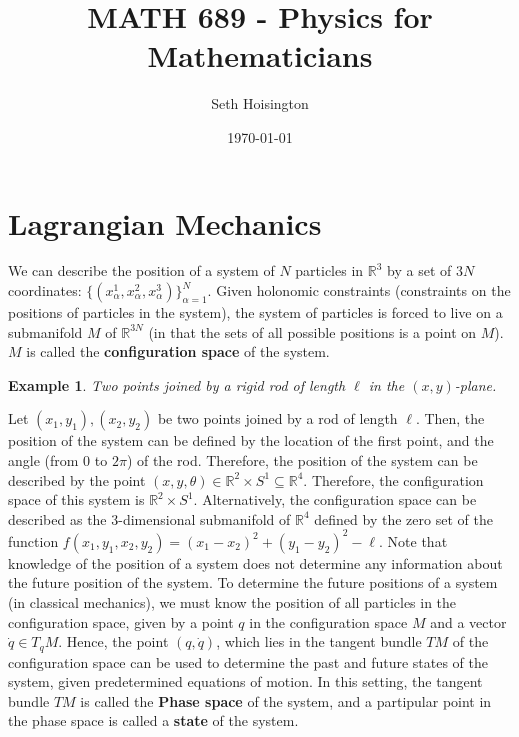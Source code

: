 \documentclass{article}
\title{MATH 689 - Physics for Mathematicians}
\author{Seth Hoisington}
\date{\today}
\newcommand{\R}{\mathbb R}
\newcommand{\nl}{\newline\newline\noindent}
\newcommand{\al}{\alpha}
\newtheorem{ex}{Example}
\begin{document}
\maketitle
\section{Lagrangian Mechanics}
We can describe the position of a system of $N$ particles in $\R^3$ by a set of $3N$ coordinates: $\{(x_\al^1,x_\al^2,x_\al^3)\}_{\al=1}^N$. 
\nl
Given holonomic constraints (constraints on the positions of particles in the system), the system of particles is forced to live on a submanifold $M$ of $\R^{3N}$ (in that the sets of all possible positions is a point on $M$). $M$ is called the \textbf{configuration space} of the system.
\begin{ex}
    Two points joined by a rigid rod of length $\ell$ in the $(x,y)$-plane.
\end{ex}
Let $(x_1,y_1), (x_2,y_2)$ be two points joined by a rod of length $\ell$. Then, the position of the system can be defined by the location of the first point, and the angle (from $0$ to $2\pi$) of the rod. Therefore, the position of the system can be described by the point $(x,y,\theta)\in \R^2\times S^1\subseteq \R^4$. Therefore, the configuration space of this system is $\R^2\times S^1$. Alternatively, the configuration space can be described as the 3-dimensional submanifold of $\R^4$ defined by the zero set of the function $f(x_1,y_1,x_2,y_2)=(x_1-x_2)^2+(y_1-y_2)^2-\ell$.
\nl
Note that knowledge of the position of a system does not determine any information about the future position of the system. To determine the future positions of a system (in classical mechanics), we must know the position of all particles in the configuration space, given by a point $q$ in the configuration space $M$ and a vector $\dot q\in T_qM$. Hence, the point $(q,\dot q)$, which lies in the tangent bundle $TM$ of the configuration space can be used to determine the past and future states of the system, given predetermined equations of motion. In this setting, the tangent bundle $TM$ is called the \textbf{Phase space} of the system, and a partipular point in the phase space is called a \textbf{state} of the system.
\end{document}
